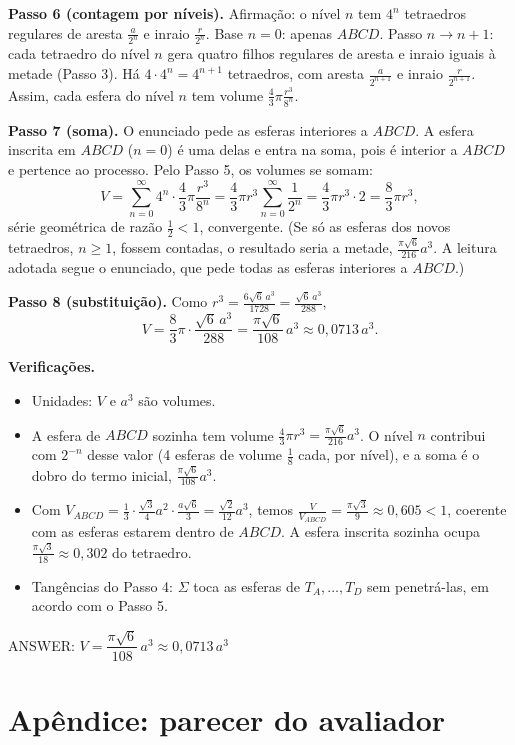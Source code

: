 \documentclass{article}%
\begin{document}
\textbf{Passo 6 (contagem por níveis).} Afirmação: o nível $n$ tem $4^n$ tetraedros regulares de aresta $\frac{a}{2^n}$ e inraio $\frac{r}{2^n}$. Base $n=0$: apenas $ABCD$. Passo $n\to n+1$: cada tetraedro do nível $n$ gera quatro filhos regulares de aresta e inraio iguais à metade (Passo 3). Há $4\cdot4^n=4^{n+1}$ tetraedros, com aresta $\frac{a}{2^{n+1}}$ e inraio $\frac{r}{2^{n+1}}$. Assim, cada esfera do nível $n$ tem volume $\frac43\pi\frac{r^3}{8^n}$.

\textbf{Passo 7 (soma).} O enunciado pede as esferas interiores a $ABCD$. A esfera inscrita em $ABCD$ ($n=0$) é uma delas e entra na soma, pois é interior a $ABCD$ e pertence ao processo. Pelo Passo 5, os volumes se somam:
\[
V=\sum_{n=0}^{\infty}4^{n}\cdot\frac43\pi\frac{r^{3}}{8^{n}}=\frac43\pi r^3\sum_{n=0}^{\infty}\frac{1}{2^{n}}=\frac43\pi r^3\cdot 2=\frac83\pi r^3,
\]
série geométrica de razão $\frac12<1$, convergente. (Se só as esferas dos novos tetraedros, $n\ge1$, fossem contadas, o resultado seria a metade, $\frac{\pi\sqrt6}{216}a^3$. A leitura adotada segue o enunciado, que pede todas as esferas interiores a $ABCD$.)

\textbf{Passo 8 (substituição).} Como $r^3=\frac{6\sqrt6\,a^3}{1728}=\frac{\sqrt6\,a^3}{288}$,
\[
V=\frac83\pi\cdot\frac{\sqrt6\,a^3}{288}=\frac{\pi\sqrt6}{108}\,a^3\approx 0{,}0713\,a^3.
\]

\textbf{Verificações.}
\begin{itemize}
\item Unidades: $V$ e $a^3$ são volumes.
\item A esfera de $ABCD$ sozinha tem volume $\frac43\pi r^3=\frac{\pi\sqrt6}{216}a^3$. O nível $n$ contribui com $2^{-n}$ desse valor (4 esferas de volume $\frac18$ cada, por nível), e a soma é o dobro do termo inicial, $\frac{\pi\sqrt6}{108}a^3$.
\item Com $V_{ABCD}=\frac13\cdot\frac{\sqrt3}{4}a^2\cdot\frac{a\sqrt6}{3}=\frac{\sqrt2}{12}a^3$, temos $\frac{V}{V_{ABCD}}=\frac{\pi\sqrt3}{9}\approx0{,}605<1$, coerente com as esferas estarem dentro de $ABCD$. A esfera inscrita sozinha ocupa $\frac{\pi\sqrt3}{18}\approx0{,}302$ do tetraedro.
\item Tangências do Passo 4: $\Sigma$ toca as esferas de $T_A,\dots,T_D$ sem penetrá-las, em acordo com o Passo 5.
\end{itemize}

ANSWER: $V=\dfrac{\pi\sqrt{6}}{108}\,a^{3}\approx 0{,}0713\,a^{3}$%
\newpage%
\section*{Apêndice: parecer do avaliador}%
\end{document}
